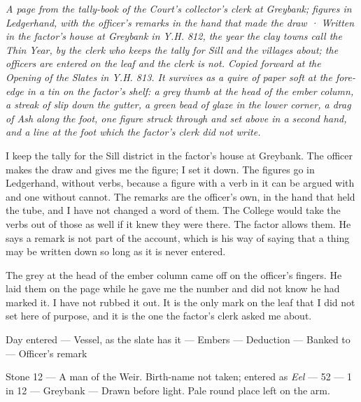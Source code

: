 \documentclass{design/chronicle}
\begin{document}
\clearpage{}
{\centering\FellFont\itshape\footnotesize\color{faded} A page from the tally-book of the Court’s collector’s clerk at Greybank; figures in Ledgerhand, with the officer’s remarks in the hand that made the draw · Written in the factor’s house at Greybank in Y.H. 812, the year the clay towns call the Thin Year, by the clerk who keeps the tally for Sill and the villages about; the officers are entered on the leaf and the clerk is not. Copied forward at the Opening of the Slates in Y.H. 813. It survives as a quire of paper soft at the fore-edge in a tin on the factor’s shelf: a grey thumb at the head of the ember column, a streak of slip down the gutter, a green bead of glaze in the lower corner, a drag of Ash along the foot, one figure struck through and set above in a second hand, and a line at the foot which the factor’s clerk did not write.\par}\medskip
I keep the tally for the Sill district in the factor’s house at Greybank. The officer makes the draw and gives me the figure; I set it down. The figures go in Ledgerhand, without verbs, because a figure with a verb in it can be argued with and one without cannot. The remarks are the officer’s own, in the hand that held the tube, and I have not changed a word of them. The College would take the verbs out of those as well if it knew they were there. The factor allows them. He says a remark is not part of the account, which is his way of saying that a thing may be written down so long as it is never entered.

The grey at the head of the ember column came off on the officer’s fingers. He laid them on the page while he gave me the number and did not know he had marked it. I have not rubbed it out. It is the only mark on the leaf that I did not set here of purpose, and it is the one the factor’s clerk asked me about.

Day entered — Vessel, as the slate has it — Embers — Deduction — Banked to — Officer’s remark\par

Stone 12 — A man of the Weir. Birth-name not taken; entered as \emph{Eel} — 52 — 1 in 12 — Greybank — Drawn before light. Pale round place left on the arm.\par
\end{document}
